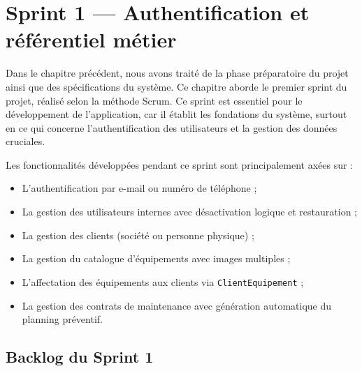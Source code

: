 \newpage
\pagestyle{fancy}
\renewcommand{\headrulewidth}{0.5pt}
\renewcommand{\footrulewidth}{0.5pt}
\chapter{Sprint 1 --- Authentification et référentiel métier}\setlength{\headheight}{28pt}
\label{ch3}
\thispagestyle{empty}
\minitoc
\newpage

Dans le chapitre précédent, nous avons traité de la phase préparatoire du projet ainsi que des
spécifications du système. Ce chapitre aborde le premier sprint du projet, réalisé selon la méthode
Scrum. Ce sprint est essentiel pour le développement de l'application, car il établit les fondations
du système, surtout en ce qui concerne l'authentification des utilisateurs et la gestion des données
cruciales.

Les fonctionnalités développées pendant ce sprint sont principalement axées sur :

\begin{itemize}
    \item L'authentification par e-mail ou numéro de téléphone ;
    \item La gestion des utilisateurs internes avec désactivation logique et restauration ;
    \item La gestion des clients (société ou personne physique) ;
    \item La gestion du catalogue d'équipements avec images multiples ;
    \item L'affectation des équipements aux clients via \texttt{ClientEquipement} ;
    \item La gestion des contrats de maintenance avec génération automatique du planning préventif.
\end{itemize}

\section{Backlog du Sprint 1}

